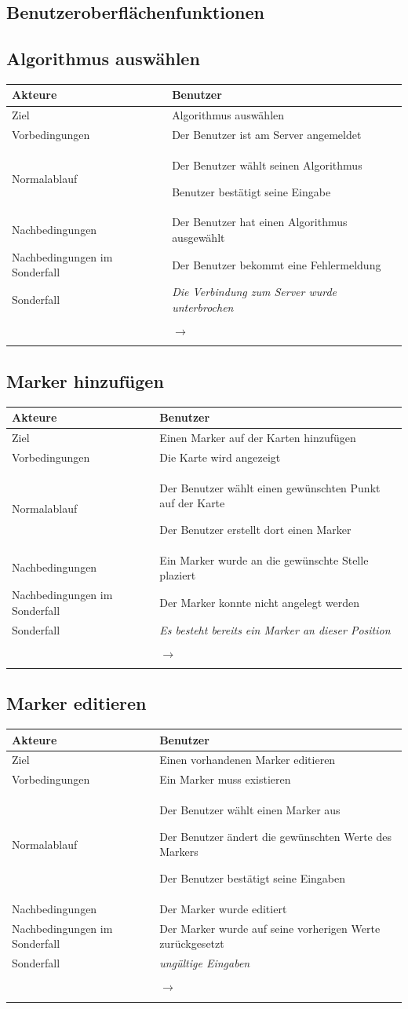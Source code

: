 \documentclass[a4paper,10pt,titlepage]{article}
\makeatletter
\newcommand\novspace{\@minipagetrue}
\newenvironment{owncompactitem}{%
\compactitem
}{%
\@finalstrut\@arstrutbox
\@nameuse{endcompactitem}%
\aftergroup\let\aftergroup\@finalstrut\aftergroup\@gobble
}
\newenvironment{owncompactenum}{%
\compactenum
}{%
\@finalstrut\@arstrutbox
\@nameuse{endcompactenum}%
\aftergroup\let\aftergroup\@finalstrut\aftergroup\@gobble
}
\newcommand{\usecase}[7]
{\subsection{#1}
\setlength{\extrarowheight}{2pt}
\begin{tabular}{|p{0.2\textwidth}|p{0.9\textwidth}|}
\hline
  Akteure & #2\\\hline
  Ziel & #3\\\hline
  Vorbedingungen & \novspace
  	\begin{owncompactitem}[-] #4 \end{owncompactitem} \\\hline
  Normalablauf & \vspace{-7pt}
  	\begin{owncompactenum}[1.] #6 \end{owncompactenum} \\\hline
  Nachbedingungen & \novspace
  	\begin{owncompactitem}[-] #5 \end{owncompactitem} \\\hline
  #7
\end{tabular}
}
\newcommand{\sonderfall}[4][\empty]
{
Sonderfall #2 & \vspace{-10pt}
	\textit{#3}
	\begin{owncompactenum}[{#2}.1] {#4} \end{owncompactenum}
  	\ifthenelse{\equal{#1}{\empty}}
    	{\\\hline} %
    	{\ensuremath{\rightarrow} #1 \\ [+1pt] \hline} %

}
\newcommand{\kurzersonderfall}[3][\empty]
{
Sonderfall #2 & \vspace{-10pt}
	\textit{#3}
  	\ifthenelse{\equal{#1}{\empty}}
    	{\\\hline} %
    	{\\&\ensuremath{\rightarrow} #1 \\ [+1pt] \hline} %

}
\newcommand{\sondernachbedingung}[1]
{
Nachbedingungen im Sonderfall& \novspace
	\begin{owncompactitem}[-]
		#1
	\end{owncompactitem} \\\hline
}
\makeatother
\begin{document}
{%
}{%
}{%
}{%
}{%
}

{%
}{%
}

{%
}

\subsection*{Benutzeroberflächenfunktionen}
\usecase{Algorithmus auswählen}{Benutzer}%
{%
Algorithmus auswählen
}{%
	\item Der Benutzer ist am Server angemeldet
}{%
	\item  Der Benutzer hat einen Algorithmus ausgewählt
}{%
	\item Der Benutzer wählt seinen Algorithmus
	\item Benutzer bestätigt seine Eingabe
}{%
\sondernachbedingung{\item Der Benutzer bekommt eine Fehlermeldung}
\kurzersonderfall[]{}%
	{%
	Die Verbindung zum Server wurde unterbrochen
	}
}

\usecase{Marker hinzufügen}{Benutzer}%
{%
Einen Marker auf der Karten hinzufügen
}{%
	\item Die Karte wird angezeigt
}{%
	\item Ein Marker wurde an die gewünschte Stelle plaziert
}{%
	\item Der Benutzer wählt einen gewünschten Punkt auf der Karte
	\item Der Benutzer erstellt dort einen Marker
}{%
\sondernachbedingung{
	\item Der Marker konnte nicht angelegt werden
	}
\kurzersonderfall[]{}%
	{%
	Es besteht bereits ein Marker an dieser Position
	}
}

\usecase{Marker editieren}{Benutzer}%
{%
Einen vorhandenen Marker editieren
}{%
	\item Ein Marker muss existieren
}{%
	\item Der Marker wurde editiert
}{%
	\item Der Benutzer wählt einen Marker aus
	\item Der Benutzer ändert die gewünschten Werte des Markers
	\item Der Benutzer bestätigt seine Eingaben
}{%
\sondernachbedingung{
	\item Der Marker wurde auf seine vorherigen Werte zurückgesetzt
	}
\kurzersonderfall[]{}%
	{%
	ungültige Eingaben
	}
}
\end{document}
